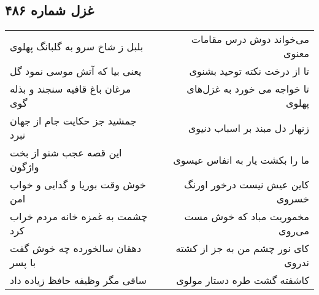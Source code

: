 \begin{center}
\section*{غزل شماره ۴۸۶}
\label{sec:sh486}
\begin{longtable}{l p{0.5cm} r}
بلبل ز شاخ سرو به گلبانگ پهلوی
&&
می‌خواند دوش درس مقامات معنوی
\\
یعنی بیا که آتش موسی نمود گل
&&
تا از درخت نکته توحید بشنوی
\\
مرغان باغ قافیه سنجند و بذله گوی
&&
تا خواجه می خورد به غزل‌های پهلوی
\\
جمشید جز حکایت جام از جهان نبرد
&&
زنهار دل مبند بر اسباب دنیوی
\\
این قصه عجب شنو از بخت واژگون
&&
ما را بکشت یار به انفاس عیسوی
\\
خوش وقت بوریا و گدایی و خواب امن
&&
کاین عیش نیست درخور اورنگ خسروی
\\
چشمت به غمزه خانه مردم خراب کرد
&&
مخموریت مباد که خوش مست می‌روی
\\
دهقان سالخورده چه خوش گفت با پسر
&&
کای نور چشم من به جز از کشته ندروی
\\
ساقی مگر وظیفه حافظ زیاده داد
&&
کاشفته گشت طره دستار مولوی
\\
\end{longtable}
\end{center}
